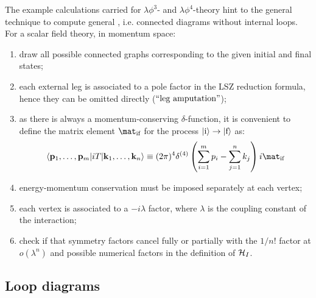The example calculations carried for $ \lambda \phi^3 $- and $ \lambda \phi^4 $-theory hint to the general technique to compute general , i.e. connected diagrams without internal loops. For a scalar field theory, in momentum space:
\begin{enumerate}
  \item draw all possible connected graphs corresponding to the given initial and final states;
  \item each external leg is associated to a pole factor in the LSZ reduction formula, hence they can be omitted directly ($ ``\text{leg amputation}" $);
  \item as there is always a momentum-conserving $ \delta $-function, it is convenient to define the matrix element $ \mat_\text{if} $ for the process $ \ket{\text{i}} \rightarrow \ket{\text{f}} $ as:
    \begin{equation}
      \braket{\ve{p}_1 , \dots , \ve{p}_m | i T | \ve{k}_1 , \dots , \ve{k}_n} \equiv (2\pi)^4 \delta^{(4)}\left( \sum_{i = 1}^{m} p_i - \sum_{j = 1}^{n} k_j \right) i \mat_\text{if}
    \end{equation}
  \item energy-momentum conservation must be imposed separately at each vertex;
  \item each vertex is associated to a $ -i \lambda $ factor, where $ \lambda $ is the coupling constant of the interaction;
  \item check if that symmetry factors cancel fully or partially with the $ 1/n! $ factor at $ o(\lambda^n) $ and possible numerical factors in the definition of $ \mathcal{H}_I $.
\end{enumerate}

\subsection{Loop diagrams}

